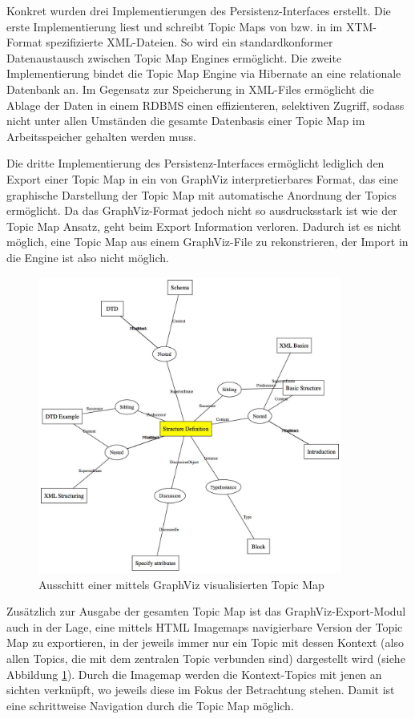 Konkret wurden drei Implementierungen des Persistenz-Interfaces erstellt. Die erste Implementierung liest und schreibt Topic Maps von bzw. in im \gls{XTM}-Format \citep{XTM06} spezifizierte \gls{XML}-Dateien. So wird ein standardkonformer Datenaustausch zwischen Topic Map Engines ermöglicht. Die zweite Implementierung bindet die Topic Map Engine via Hibernate \citep{Hibernate07} an eine relationale Datenbank an. Im Gegensatz zur Speicherung in \gls{XML}-Files ermöglicht die Ablage der Daten in einem \gls{RDBMS} einen effizienteren, selektiven Zugriff, sodass nicht unter allen Umständen die gesamte Datenbasis einer Topic Map im Arbeitsspeicher gehalten werden muss.

Die dritte Implementierung des Persistenz-Interfaces ermöglicht lediglich den Export einer Topic Map in ein von GraphViz \citep{Ellson02} interpretierbares Format, das eine graphische Darstellung der Topic Map mit automatische Anordnung der Topics ermöglicht. Da das GraphViz-Format jedoch nicht so ausdrucksstark ist wie der Topic Map Ansatz, geht beim Export Information verloren. Dadurch ist es nicht möglich, eine Topic Map aus einem GraphViz-File zu rekonstrieren, der Import in die Engine ist also nicht möglich. 

\begin{figure}[htbp]
	\centering
		\includegraphics[width=10cm]{img/Persistenz/GraphVizExample.jpg}
	\caption{Ausschitt einer mittels GraphViz visualisierten Topic Map}
	\label{fig:img_Persistenz_GraphViz}
\end{figure}

Zusätzlich zur Ausgabe der gesamten Topic Map ist das GraphViz-Export-Modul auch in der Lage, eine mittels HTML Imagemaps navigierbare Version der Topic Map zu exportieren, in der jeweils immer nur ein Topic mit dessen Kontext (also allen Topics, die mit dem zentralen Topic verbunden sind) dargestellt wird (siehe Abbildung \ref{fig:img_Persistenz_GraphViz}). Durch die Imagemap werden die Kontext-Topics mit jenen an sichten verknüpft, wo jeweils diese im Fokus der Betrachtung stehen. Damit ist eine schrittweise Navigation durch die Topic Map möglich.

